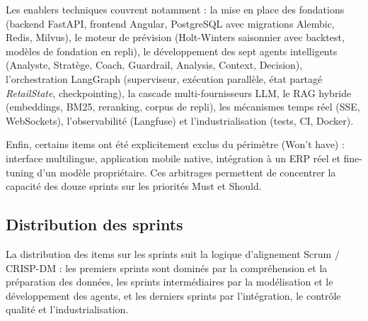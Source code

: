 Les enablers techniques couvrent notamment : la mise en place des fondations (backend FastAPI, frontend Angular, PostgreSQL avec migrations Alembic, Redis, Milvus), le moteur de prévision (Holt-Winters saisonnier avec backtest, modèles de fondation en repli), le développement des sept agents intelligents (Analyste, Stratège, Coach, Guardrail, Analysis, Context, Decision), l'orchestration LangGraph (superviseur, exécution parallèle, état partagé \textit{RetailState}, checkpointing), la cascade multi-fournisseurs LLM, le RAG hybride (embeddings, BM25, reranking, corpus de repli), les mécanismes temps réel (SSE, WebSockets), l'observabilité (Langfuse) et l'industrialisation (tests, CI, Docker).

Enfin, certains items ont été explicitement exclus du périmètre (Won't have) : interface multilingue, application mobile native, intégration à un ERP réel et fine-tuning d'un modèle propriétaire. Ces arbitrages permettent de concentrer la capacité des douze sprints sur les priorités Must et Should.

\subsection{Distribution des sprints}

La distribution des items sur les sprints suit la logique d'alignement Scrum / CRISP-DM : les premiers sprints sont dominés par la compréhension et la préparation des données, les sprints intermédiaires par la modélisation et le développement des agents, et les derniers sprints par l'intégration, le contrôle qualité et l'industrialisation.

